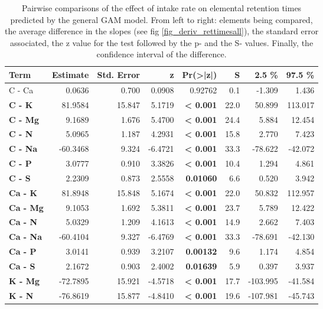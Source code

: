 \begin{table}[H]
\centering
\caption{\label{tab:table_pairs_d_rt}Pairwise comparisons of the effect of intake rate on elemental retention times predicted by the general GAM model. From left to right: elements being compared, the average difference in the slopes (see fig \ref{fig_deriv_rettimesall}), the standard error associated, the z value for the test followed by the p- and the S- values. Finally, the confidence interval of the difference.}
\centering
\begin{tabular}[t]{>{}lrrr>{}rrrr}
\toprule
\textbf{Term} & \textbf{Estimate} & \textbf{Std. Error} & \textbf{z} & \textbf{Pr(>|z|)} & \textbf{S} & \textbf{2.5 \%} & \textbf{97.5 \%}\\
\midrule
C - Ca & 0.0636 & 0.700 & 0.0908 & 0.92762 & 0.1 & -1.309 & 1.436\\
\textbf{C - K} & 81.9584 & 15.847 & 5.1719 & \textbf{< 0.001} & 22.0 & 50.899 & 113.017\\
\textbf{C - Mg} & 9.1689 & 1.676 & 5.4700 & \textbf{< 0.001} & 24.4 & 5.884 & 12.454\\
\textbf{C - N} & 5.0965 & 1.187 & 4.2931 & \textbf{< 0.001} & 15.8 & 2.770 & 7.423\\
\textbf{C - Na} & -60.3468 & 9.324 & -6.4721 & \textbf{< 0.001} & 33.3 & -78.622 & -42.072\\
\textbf{C - P} & 3.0777 & 0.910 & 3.3826 & \textbf{< 0.001} & 10.4 & 1.294 & 4.861\\
\textbf{C - S} & 2.2309 & 0.873 & 2.5558 & \textbf{0.01060} & 6.6 & 0.520 & 3.942\\
\textbf{Ca - K} & 81.8948 & 15.848 & 5.1674 & \textbf{< 0.001} & 22.0 & 50.832 & 112.957\\
\textbf{Ca - Mg} & 9.1053 & 1.692 & 5.3811 & \textbf{< 0.001} & 23.7 & 5.789 & 12.422\\
\textbf{Ca - N} & 5.0329 & 1.209 & 4.1613 & \textbf{< 0.001} & 14.9 & 2.662 & 7.403\\
\textbf{Ca - Na} & -60.4104 & 9.327 & -6.4769 & \textbf{< 0.001} & 33.3 & -78.691 & -42.130\\
\textbf{Ca - P} & 3.0141 & 0.939 & 3.2107 & \textbf{0.00132} & 9.6 & 1.174 & 4.854\\
\textbf{Ca - S} & 2.1672 & 0.903 & 2.4002 & \textbf{0.01639} & 5.9 & 0.397 & 3.937\\
\textbf{K - Mg} & -72.7895 & 15.921 & -4.5718 & \textbf{< 0.001} & 17.7 & -103.995 & -41.584\\
\textbf{K - N} & -76.8619 & 15.877 & -4.8410 & \textbf{< 0.001} & 19.6 & -107.981 & -45.743\\

\end{tabular}
\end{table}
